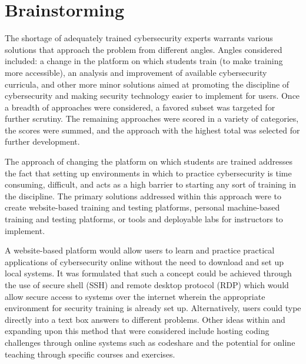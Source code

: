 \documentclass[openright]{report}
\begin{document}
\section{Brainstorming}

\par The shortage of adequately trained cybersecurity experts warrants various solutions that approach the problem from different angles. Angles considered included: a change in the platform on which students train (to make training more accessible), an analysis and improvement of available cybersecurity curricula, and other more minor solutions aimed at promoting the discipline of cybersecurity and making security technology easier to implement for users. Once a breadth of approaches were considered, a favored subset was targeted for further scrutiny. The remaining approaches were scored in a variety of categories, the scores were summed, and the approach with the highest total was selected for further development. 

\par The approach of changing the platform on which students are trained addresses the fact that setting up environments in which to practice cybersecurity is time consuming, difficult, and acts as a high barrier to starting any sort of training in the discipline. The primary solutions addressed within this approach were to create website-based training and testing platforms, personal machine-based training and testing platforms, or tools and deployable labs for instructors to implement. 

\par A website-based platform would allow users to learn and practice practical applications of cybersecurity online without the need to download and set up local systems. It was formulated that such a concept could be achieved through the use of secure shell (SSH) and remote desktop protocol (RDP) which would allow secure access to systems over the internet wherein the appropriate environment for security training is already set up. Alternatively, users could type directly into a text box answers to different problems. Other ideas within and expanding upon this method that were considered include hosting coding challenges through online systems such as codeshare and the potential for online teaching through specific courses and exercises. 
\end{document}
